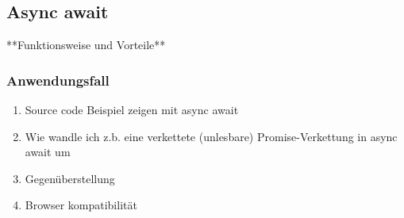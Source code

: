 \subsection{Async await}
**Funktionsweise und Vorteile**

\subsubsection{Anwendungsfall}

\begin{enumerate} 
\item Source code Beispiel zeigen mit async await
\item Wie wandle ich z.b. eine verkettete (unlesbare) Promise-Verkettung in async await um 
\item Gegenüberstellung
\item Browser kompatibilität
\end{enumerate}


